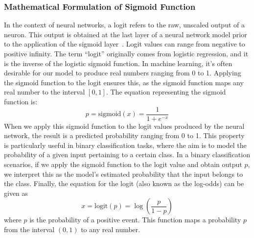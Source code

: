 \documentclass[authoryear,preprint,review,12pt]{elsarticle}
\begin{document}
\subsubsection{Mathematical Formulation of Sigmoid Function}
In the context of neural networks, a logit refers to the raw, unscaled output of a neuron. This output is obtained at the last layer of a neural network model prior to the application of the sigmoid layer~\cite{furnieles_Sigmoid_2022}. Logit values can range from negative to positive infinity. The term ``logit'' originally comes from logistic regression, and it is the inverse of the logistic sigmoid function. In machine learning, it's often desirable for our model to produce real numbers ranging from 0 to 1. Applying the sigmoid function to the logit ensures this, as the sigmoid function maps any real number to the interval \([0,1]\).
The equation representing the sigmoid function is:
\begin{equation}
p = \text{{sigmoid}}(x) = \frac{1}{1 + e^{-x}}
\end{equation}
When we apply this sigmoid function to the logit values produced by the neural network, the result is a predicted probability ranging from 0 to 1. This property is particularly useful in binary classification tasks, where the aim is to model the probability of a given input pertaining to a certain class.
In a binary classification scenarios, if we apply the sigmoid function to the logit value and obtain output \( p \), we interpret this as the model's estimated probability that the input belongs to the class.
Finally, the equation for the logit (also known as the log-odds) can be given as
\begin{equation}
x = \text{{logit}}(p) = \log \left( \frac{p}{1 - p} \right)
\end{equation}
where \( p \) is the probability of a positive event. This function maps a probability \( p \) from the interval \((0,1)\) to any real number.
%
\end{document}
